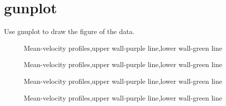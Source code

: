 \section{gunplot}
Use gnuplot to draw the figure of the data.
\begin{figure}[htbp]
\centering
 \caption{Mean-velocity profiles,upper wall-purple line,lower wall-green line}
\label{pd}
\end{figure}

\begin{figure}[H]
\centering
 \caption{Mean-velocity profiles,upper wall-purple line,lower wall-green line}
\label{pd}
\end{figure}

\begin{figure}[H]
\centering
 \caption{Mean-velocity profiles,upper wall-purple line,lower wall-green line}
\label{pd}
\end{figure}

\begin{figure}[H]
\centering
 \caption{Mean-velocity profiles,upper wall-purple line,lower wall-green line}
\label{pd}
\end{figure}

